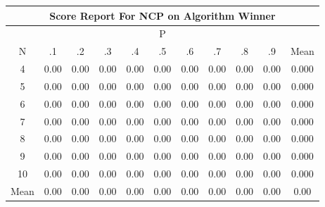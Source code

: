 \documentclass[11pt,a4paper]{report}
\begin{document}
\begin{longtable}{ | c || c | c | c | c | c | c | c | c | c || c |}
\hline
\multicolumn{11}{|c|}{ Score Report For NCP on Algorithm Winner} \\
\hline
\multicolumn{11}{|c|}{ P } \\
\hline
N & .1 & .2 & .3 & .4 & .5 & .6 & .7 & .8 & .9 & Mean\\
 \hline
 \hline
 \endhead
  4 &  \cellcolor[HTML]{FFFFFF} 0.00 &  \cellcolor[HTML]{FFFFFF} 0.00 &  \cellcolor[HTML]{FFFFFF} 0.00 &  \cellcolor[HTML]{FFFFFF} 0.00 &  \cellcolor[HTML]{FFFFFF} 0.00 &  \cellcolor[HTML]{FFFFFF} 0.00 &  \cellcolor[HTML]{FFFFFF} 0.00 &  \cellcolor[HTML]{FFFFFF} 0.00 &  \cellcolor[HTML]{FFFFFF} 0.00 & 0.000 \\
  5 &  \cellcolor[HTML]{FFFFFF} 0.00 &  \cellcolor[HTML]{FFFFFF} 0.00 &  \cellcolor[HTML]{FFFFFF} 0.00 &  \cellcolor[HTML]{FFFFFF} 0.00 &  \cellcolor[HTML]{FFFFFF} 0.00 &  \cellcolor[HTML]{FFFFFF} 0.00 &  \cellcolor[HTML]{FFFFFF} 0.00 &  \cellcolor[HTML]{FFFFFF} 0.00 &  \cellcolor[HTML]{FFFFFF} 0.00 & 0.000 \\
  6 &  \cellcolor[HTML]{FFFFFF} 0.00 &  \cellcolor[HTML]{FFFFFF} 0.00 &  \cellcolor[HTML]{FFFFFF} 0.00 &  \cellcolor[HTML]{FFFFFF} 0.00 &  \cellcolor[HTML]{FFFFFF} 0.00 &  \cellcolor[HTML]{FFFFFF} 0.00 &  \cellcolor[HTML]{FFFFFF} 0.00 &  \cellcolor[HTML]{FFFFFF} 0.00 &  \cellcolor[HTML]{FFFFFF} 0.00 & 0.000 \\
  7 &  \cellcolor[HTML]{FFFFFF} 0.00 &  \cellcolor[HTML]{FFFFFF} 0.00 &  \cellcolor[HTML]{FFFFFF} 0.00 &  \cellcolor[HTML]{FFFFFF} 0.00 &  \cellcolor[HTML]{FFFFFF} 0.00 &  \cellcolor[HTML]{FFFFFF} 0.00 &  \cellcolor[HTML]{FFFFFF} 0.00 &  \cellcolor[HTML]{FFFFFF} 0.00 &  \cellcolor[HTML]{FFFFFF} 0.00 & 0.000 \\
  8 &  \cellcolor[HTML]{FFFFFF} 0.00 &  \cellcolor[HTML]{FFFFFF} 0.00 &  \cellcolor[HTML]{FFFFFF} 0.00 &  \cellcolor[HTML]{FFFFFF} 0.00 &  \cellcolor[HTML]{FFFFFF} 0.00 &  \cellcolor[HTML]{FFFFFF} 0.00 &  \cellcolor[HTML]{FFFFFF} 0.00 &  \cellcolor[HTML]{FFFFFF} 0.00 &  \cellcolor[HTML]{FFFFFF} 0.00 & 0.000 \\
  9 &  \cellcolor[HTML]{FFFFFF} 0.00 &  \cellcolor[HTML]{FFFFFF} 0.00 &  \cellcolor[HTML]{FFFFFF} 0.00 &  \cellcolor[HTML]{FFFFFF} 0.00 &  \cellcolor[HTML]{FFFFFF} 0.00 &  \cellcolor[HTML]{FFFFFF} 0.00 &  \cellcolor[HTML]{FFFFFF} 0.00 &  \cellcolor[HTML]{FFFFFF} 0.00 &  \cellcolor[HTML]{FFFFFF} 0.00 & 0.000 \\
  10 &  \cellcolor[HTML]{FFFFFF} 0.00 &  \cellcolor[HTML]{FFFFFF} 0.00 &  \cellcolor[HTML]{FFFFFF} 0.00 &  \cellcolor[HTML]{FFFFFF} 0.00 &  \cellcolor[HTML]{FFFFFF} 0.00 &  \cellcolor[HTML]{FFFFFF} 0.00 &  \cellcolor[HTML]{FFFFFF} 0.00 &  \cellcolor[HTML]{FFFFFF} 0.00 &  \cellcolor[HTML]{FFFFFF} 0.00 & 0.000 \\
 \hline
 \hline
Mean &  \cellcolor[HTML]{FFFFFF} 0.00 &  \cellcolor[HTML]{FFFFFF} 0.00 &  \cellcolor[HTML]{FFFFFF} 0.00 &  \cellcolor[HTML]{FFFFFF} 0.00 &  \cellcolor[HTML]{FFFFFF} 0.00 &  \cellcolor[HTML]{FFFFFF} 0.00 &  \cellcolor[HTML]{FFFFFF} 0.00 &  \cellcolor[HTML]{FFFFFF} 0.00 &  \cellcolor[HTML]{FFFFFF} 0.00 &  \cellcolor[HTML]{FFFFFF} 0.00
\end{longtable}
\end{document}
